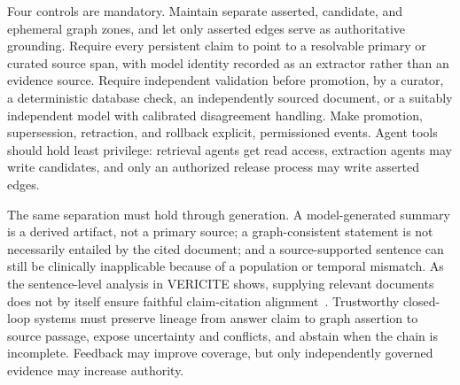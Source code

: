Four controls are mandatory. Maintain separate asserted, candidate, and ephemeral graph zones, and let only asserted edges serve as authoritative grounding. Require every persistent claim to point to a resolvable primary or curated source span, with model identity recorded as an extractor rather than an evidence source. Require independent validation before promotion, by a curator, a deterministic database check, an independently sourced document, or a suitably independent model with calibrated disagreement handling. Make promotion, supersession, retraction, and rollback explicit, permissioned events. Agent tools should hold least privilege: retrieval agents get read access, extraction agents may write candidates, and only an authorized release process may write asserted edges.

The same separation must hold through generation. A model-generated summary is a derived artifact, not a primary source; a graph-consistent statement is not necessarily entailed by the cited document; and a source-supported sentence can still be clinically inapplicable because of a population or temporal mismatch. As the sentence-level analysis in VERICITE shows, supplying relevant documents does not by itself ensure faithful claim-citation alignment~\cite{ma2026vericite}. Trustworthy closed-loop systems must preserve lineage from answer claim to graph assertion to source passage, expose uncertainty and conflicts, and abstain when the chain is incomplete. Feedback may improve coverage, but only independently governed evidence may increase authority.
